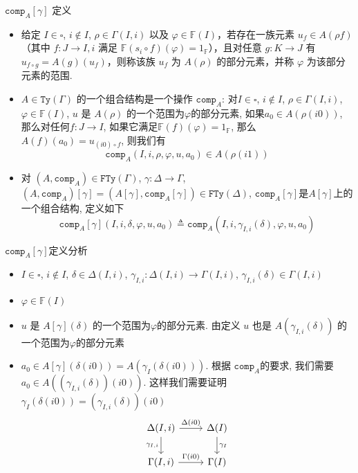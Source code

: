 \documentclass[aspectratio=169,xcolor=dvipsnames]{beamer}
\newcommand\bbF{\mathbb{F}}
\newcommand\FTy{\mathtt{FTy}}
\newcommand\comp{\mathtt{comp}}
\newcommand\Ty{\mathtt{Ty}}
\begin{document}
\begin{frame}[shrink]{$\comp_A[\gamma]$ 定义}
  \begin{itemize}
  \item 给定 $I \in \square$, $i \notin I$, $\rho \in \Gamma(I, i)$ 以及 $\varphi \in \bbF(I)$，若存在一族元素 $u_f \in A(\rho f)$（其中 $f : J \to I,i$ 满足 $ \bbF(s_i \circ f)(\varphi) = 1_{\bbF} $），且对任意 $ g : K \to J $ 有 $u_{f \circ g} = A(g)(u_f)$，则称该族 $u_f$ 为 $A(\rho)$ 的部分元素，并称 $\varphi$ 为该部分元素的范围.
  \item $A\in\Ty(\Gamma)$ 的一个组合结构是一个操作 $\comp_A$: 对$I\in\square$, $i\notin I$, $\rho\in\Gamma(I,i)$, $\varphi\in\bbF(I)$, $u$ 是 $A(\rho)$ 的一个范围为$\varphi$的部分元素, 如果$a_0\in A(\rho(i0))$, 那么对任何$f:J\to I$, 如果它满足$\bbF(f)(\varphi)=1_{\bbF}$, 那么$A(f)(a_0)=u_{(i0)\circ f}$, 则我们有
  \[
  \comp_A(I,i,\rho,\varphi,u,a_0) \in A(\rho(i1))
  \]
  \item 对 $(A,\comp_A)\in\FTy(\Gamma)$, $\gamma : \Delta \to \Gamma$, $(A,\comp_A)[\gamma]=(A[\gamma],\comp_A[\gamma]) \in \FTy(\Delta)$, $\comp_A[\gamma]$是$A[\gamma]$上的一个组合结构, 定义如下
  \[
      \comp_A[\gamma](I,i,\delta,\varphi,u,a_0) \triangleq
      \comp_A(I,i,\gamma_{I,i}(\delta),\varphi,u,a_0)
  \]
  \end{itemize}

\end{frame}

\begin{frame}{$\comp_A[\gamma]$定义分析}
\begin{itemize}
  \item $I\in\square$, $i\notin I$, $\delta\in\Delta(I,i)$, $\gamma_{I,i} : \Delta(I,i) \to \Gamma(I,i)$, $\gamma_{I,i}(\delta) \in \Gamma(I,i)$
  \item $\varphi\in\bbF(I)$
  \item $u$ 是 $A[\gamma](\delta)$ 的一个范围为$\varphi$的部分元素. 由定义 $u$ 也是 $A(\gamma_{I,i}(\delta))$ 的一个范围为$\varphi$的部分元素
  \item $a_0\in A[\gamma](\delta(i0)) = A(\gamma_I(\delta(i0)))$. 根据 $\comp_A$的要求, 我们需要 $a_0 \in A((\gamma_{I,i}(\delta))(i0))$. 这样我们需要证明 $\gamma_I(\delta(i0)) = (\gamma_{I,i}(\delta))(i0)$
      \[
    \begin{tikzcd}
      \Delta(I,i) \arrow[r,"{\Delta(i0)}"] \arrow[d,"{\gamma_{I,i}}"'] & \Delta(I) \arrow[d,"{\gamma_I}"] \\
      \Gamma(I,i) \arrow[r,"{\Gamma(i0)}"] & \Gamma(I)
    \end{tikzcd}
  \]
\end{itemize}
\end{frame}
\end{document}
